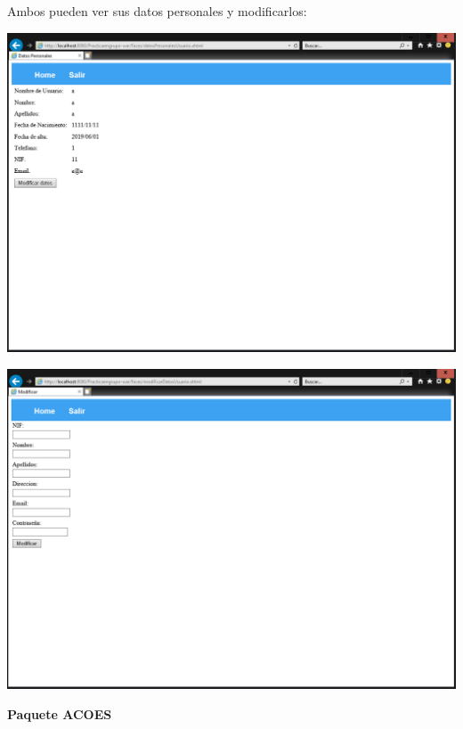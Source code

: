 \documentclass{article}
\begin{document}
Ambos pueden ver sus datos personales y modificarlos:

\begin{center}
\includegraphics[scale=0.5]{capturas/VERDATOSPERSONALES.PNG}
\end{center}

\begin{center}
\includegraphics[scale=0.5]{capturas/MODIFICARDATOSPERSONALES.PNG}
\end{center}

\textbf{Paquete ACOES}
\end{document}
